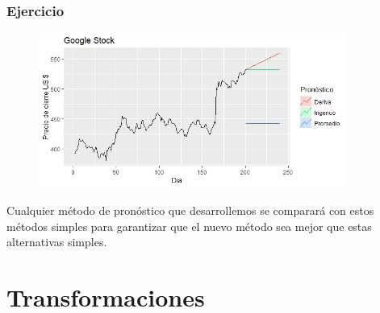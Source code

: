 \documentclass[10pt]{beamer}
\begin{document}
\begin{frame}[fragile]
\frametitle{Ejercicio}


\begin{figure}
\begin{center}
    \includegraphics[width=0.9\textwidth]{Imagen2.JPEG}
\end{center}
\end{figure}

\small{Cualquier método de pronóstico que desarrollemos se comparará con estos métodos simples para garantizar que el nuevo método sea mejor que estas alternativas simples. 
}
\end{frame}





\section{Transformaciones}
\end{document}
